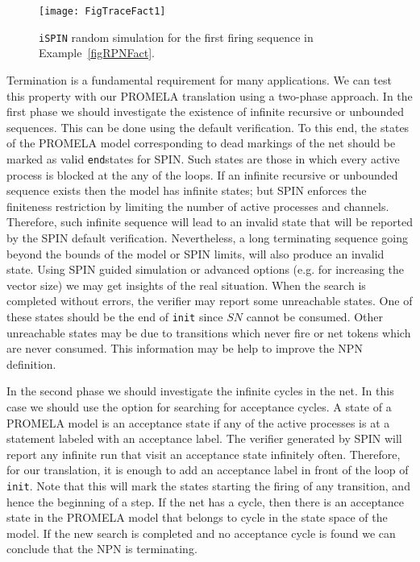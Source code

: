 \documentclass{llncs}
\begin{document}
\begin{figure}
\begin{center}
\texttt{[image: FigTraceFact1]}
\end{center}
\vspace{-10pt}
\caption{\texttt{iSPIN} random simulation for the first firing sequence in Example~\ref{figRPNFact}.}
\label{figTraceFact}
\end{figure}

Termination is a fundamental requirement for many applications. We can test this property with our PROMELA translation using a two-phase approach. In the first phase we should investigate the existence of infinite recursive or unbounded sequences. This can be done using the default verification. To this end, the states of the PROMELA model corresponding to dead markings of the net should be marked as valid \small\texttt{end}\nfont states for SPIN. Such states are those in which every active process is blocked at the any of the loops. If an infinite recursive or unbounded sequence exists then the model has infinite states; but SPIN enforces the finiteness restriction by limiting the number of active processes and channels. Therefore, such infinite sequence will lead to an invalid state that will be reported by the SPIN default verification. Nevertheless, a long terminating sequence going beyond the bounds of the model or SPIN limits, will also produce an invalid state. Using SPIN guided simulation or advanced options (e.g. for increasing the vector size) we may get insights of the real situation. When the search is completed without errors, the verifier may report some unreachable states. One of these states should be the end of \texttt{init} since $SN$ cannot be consumed. Other unreachable states may be due to transitions which never fire or net tokens which are never consumed. This information may be help to improve the NPN definition.

In the second phase we should investigate the infinite cycles in the net. In this case we should use the option for searching for acceptance cycles. A state of a PROMELA model is an acceptance state if any of the active processes is at a statement labeled with an acceptance label. The verifier generated by SPIN will report any infinite run that visit an acceptance state infinitely often. Therefore, for our translation, it is enough to add an acceptance label in front of the loop of \small\texttt{init}\nfont. Note that this will mark the states starting the firing of any transition, and hence the beginning of a step. If the net has a cycle, then there is an acceptance state in the PROMELA model that belongs to cycle in the state space of the model. If the new search is completed and no acceptance cycle is found we can conclude that the NPN is terminating.
\end{document}
